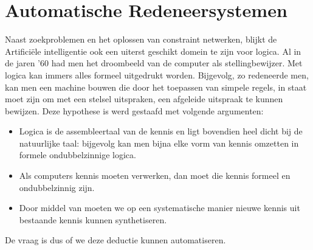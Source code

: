 \section{Automatische Redeneersystemen}
\label{s:automaticReasoning}
Naast zoekproblemen en het oplossen van constraint netwerken, blijkt de Artifici\"ele intelligentie ook een uiterst geschikt domein te zijn voor logica. Al in de jaren '60 had men het droombeeld van de computer als stellingbewijzer. Met logica kan immers alles formeel uitgedrukt worden. Bijgevolg, zo redeneerde men, kan men een machine bouwen die door het toepassen van simpele regels, in staat moet zijn om met een stelsel uitspraken, een afgeleide uitspraak te kunnen bewijzen. Deze hypothese is werd gestaafd met volgende argumenten:
\begin{itemize}
 \item Logica is de assembleertaal van de kennis en ligt bovendien heel dicht bij de natuurlijke taal: bijgevolg kan men bijna elke vorm van kennis omzetten in formele ondubbelzinnige logica.
 \item Als computers kennis moeten verwerken, dan moet die kennis formeel en ondubbelzinnig zijn.
 \item Door middel van  moeten we op een systematische manier nieuwe kennis uit bestaande kennis kunnen synthetiseren.
\end{itemize}
De vraag is dus of we deze deductie kunnen automatiseren.
